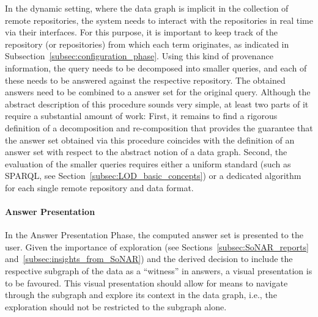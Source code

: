In the dynamic setting, where the data graph is implicit in the collection of remote repositories,
the system needs to interact with the repositories in real time via their interfaces.
For this purpose, it is important to keep track of the repository (or repositories)
from which each term originates, as indicated in Subsection~\ref{subsec:configuration_phase}.
Using this kind of provenance information, the query needs to be decomposed into
smaller queries, and each of these needs to be answered against the respective repository.
The obtained answers need to be combined to a answer set for the original query.
Although the abstract description of this procedure sounds very simple,
at least two parts of it require a substantial amount of work:
First, it remains to find a rigorous definition of a decomposition and re-composition
that provides the guarantee that the answer set obtained via this procedure 
coincides with the definition of an answer set with respect to the abstract notion
of a data graph.
Second, the evaluation of the smaller queries
requires either a uniform standard (such as \gls{SPARQL}, see Section~\ref{subsec:LOD_basic_concepts})
or a dedicated algorithm for each single remote repository and data format.
%
%

\paragraph{Answer Presentation}

In the Answer Presentation Phase, the computed answer set is presented to the user.
Given the importance of exploration (see Sections~\ref{subsec:SoNAR_reports} and~\ref{subsec:insights_from_SoNAR})
and the derived decision to include the respective subgraph of the data as a \enquote{witness} in answers,
a visual presentation is to be favoured. This visual presentation should allow for means to navigate through the subgraph
and explore its context in the data graph, i.e., the exploration should not be restricted to the subgraph alone.

